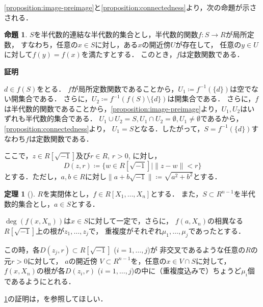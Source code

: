 \documentclass[uplatex, dvipdfmx]{jsarticle}
\makeatletter
\numberwithin{equation}{section}
\renewenvironment{proof}[1][\proofname]{\par
  \pushQED{\qed}%
  \normalfont \topsep6\p@\@plus6\p@\relax
  \trivlist
  \item\relax
  {\bfseries
  #1\@addpunct{.}}\hspace\labelsep\ignorespaces
}{
  \popQED\endtrivlist\@endpefalse
}
\newcommand{\map}[3]{{#1}\colon{#2}\rightarrow{#3}}
\newcommand{\norm}[1]{\| {#1} \|}
\theoremstyle{definition}
\newtheorem{proposition}[definition]{命題}
\newtheorem{theorem}[definition]{定理}
\renewcommand{\proofname}{\textbf{証明}}
\makeatother
\begin{document}
\cref{proposition:image-preimage}と\cref{proposition:connectedness}より，次の命題が示さされる．

\begin{proposition}{\cite[Proposition 3.9.]{MR2248869}}
     $S$を半代数的連結な半代数的集合とし，半代数的関数$\map{f}{S}{R}$が局所定数，
     すなわち，任意の$x \in S$に対し，ある$x$の開近傍$U$が存在して，
     任意の$y \in U$に対して$f(y)=f(x)$を満たすとする．
     このとき，$f$は定数関数である．
\end{proposition}
\begin{proof}
     $d \in f(S)$をとる．
     $f$が局所定数関数であることから，$U_1\coloneqq f^{-1}(\{d\})$は空でない開集合である．
     さらに，$U_2\coloneqq f^{-1}(f(S) \setminus \{d\})$は開集合である．
     さらに，$f$は半代数的関数であることから，\cref{proposition:image-preimage}より，$U_1, U_2$はいずれも半代数的集合である．
     $U_1 \cup U_2 = S, U_1 \cap U_2 = \emptyset, U_1 \neq \emptyset$であるから，\cref{proposition:connectedness}より，
     $U_1 = S$となる．したがって，$S = f^{-1}(\{d\})$すなわち$f$は定数関数である．
\end{proof}

ここで，$z \in R\left[ \sqrt{-1} \right]$及び$r \in R$, $r>0$, に対し，
\begin{equation}
     D(z, r)\coloneqq \{w \in R\left[\sqrt{-1}\right] \mid \norm{z - w} < r\}
\end{equation}
とする．ただし，$a,b \in R$に対し$\norm{a + b\sqrt{-1}} \coloneqq \sqrt{a^2 + b^2}$とする．

\begin{theorem}[{\cite[Theorem 5.12.]{MR2248869}}] \label{theorem:continuity-of-roots}
     $R$を実閉体とし，$f \in R[X_1, \dots, X_n]$とする．
     また，$S \subset R^{n-1}$を半代数的集合とし，$a \in S$とする．

     $\deg (f(x,X_n))$は$x \in S$に対して一定で，さらに，
     $f(a,X_n)$の相異なる$R\left[\sqrt{-1} \right]$上の根が$z_1, \dots, z_j$で，
     重複度がそれぞれ$\mu_1, \dots, \mu_j$であったとする．

     この時，各$D(z_j, r) \subset R\left[ \sqrt{-1} \right]$ ($i=1, \dots, j$)が
     非交叉であるような任意の$R$の元$r > 0$に対して，
     $a$の開近傍 $V \subset R^{n-1}$を，任意の$x \in V \cap S$に対して，
     $f(x, X_n)$の根が各$D(z_i, r)$ ($i=1, \dots, j$)の中に（重複度込みで）ちょうど$\mu_i$個であるようにとれる．
\end{theorem}

\cref{theorem:continuity-of-roots}の証明は，\cite[Theorem 5.12.]{MR2248869}を参照してほしい．
\end{document}
